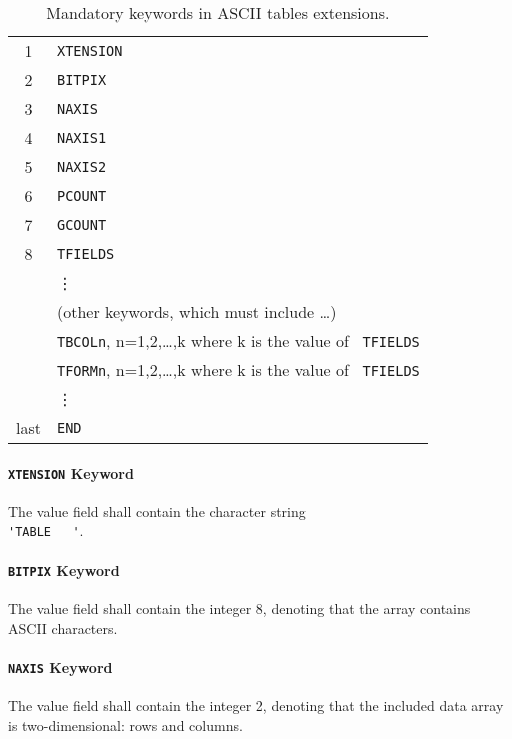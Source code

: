 \begin{table}[htbp]
 \begin{center}
  \begin{tabular}{cl}
       1 & {\tt XTENSION} \\
       2 & {\tt BITPIX} \\
       3 & {\tt NAXIS} \\
       4 & {\tt NAXIS1} \\
       5 & {\tt NAXIS2} \\
       6 & {\tt PCOUNT} \\
       7 & {\tt GCOUNT} \\
       8 & {\tt TFIELDS} \\
         & \vdots \\
         & (other keywords, which must include \ldots ) \\
         & {\tt TBCOLn}, n=1,2,\ldots,k where k is the value of {\tt
TFIELDS} \\
         & {\tt TFORMn}, n=1,2,\ldots,k where k is the value of {\tt
TFIELDS} \\
         & \vdots \\
    last  & {\tt END} \\
   \end{tabular} 
 \end{center}
 \caption{Mandatory keywords in ASCII tables extensions.}
 \label{t:hdr3}                      
\end{table}

   \paragraph{{\tt XTENSION} Keyword}
 The value field shall contain the
character 
 string \\ \verb*+'TABLE   '+.
  
   \paragraph{{\tt BITPIX} Keyword}
 The value field shall contain the integer 8, denoting
 that the array contains ASCII characters.  
  
   \paragraph{{\tt NAXIS} Keyword}
 The value field shall contain the integer 2, denoting
 that the included data array is two-dimensional: rows and
 columns.
  
